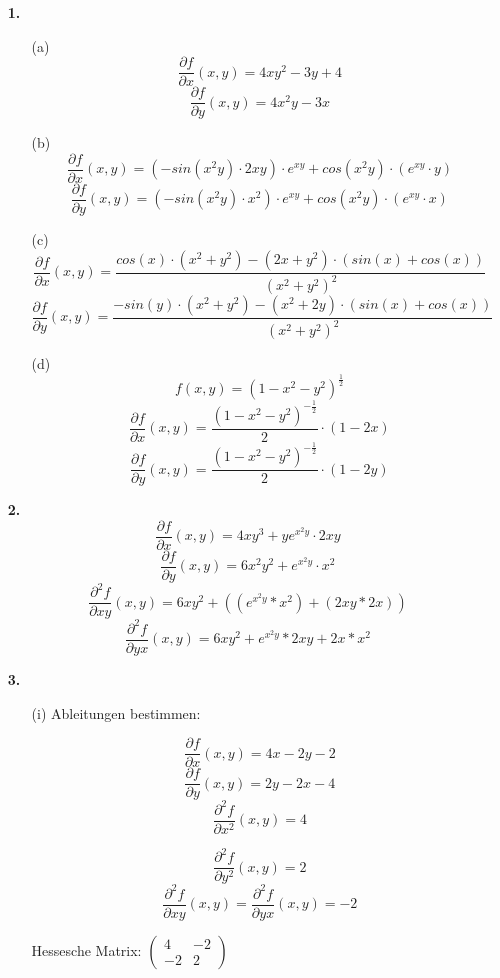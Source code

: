 \documentclass[a4paper,11pt,fleqn]{scrartcl}
\author{\authorinfo}
\title{\titleinfo}
\date{\today}
\newcommand{\partx}[0]{\frac{\partial f}{\partial x}  (x,y)}
\newcommand{\party}[0]{\frac{\partial f}{\partial y}  (x,y)}
\newcommand{\partxp}[1]{\frac{\partial^#1 f}{\partial x^#1}  (x,y)}
\newcommand{\partyp}[1]{\frac{\partial^#1 f}{\partial y^#1}  (x,y)}
\newcommand{\partxy}[1]{\frac{\partial^#1 f}{\partial xy}  (x,y)}
\newcommand{\partyx}[1]{\frac{\partial^#1 f}{\partial yx}  (x,y)}
\begin{document}
\maketitle
\begin{enumerate}
    \item[\textbf{1.}]
        \begin{enumerate}
            \item[(a)]
                \[\partx = 4xy^2 - 3y + 4\]
                \[\party = 4x^2 y - 3x\]  
            \item[(b)]
                \[\partx = (-sin(x^2y) \cdot 2xy) \cdot e^{xy} + cos(x^2y) \cdot (e^{xy} \cdot y)\]
                \[\party = (-sin(x^2y) \cdot x^2) \cdot e^{xy} + cos(x^2y) \cdot (e^{xy} \cdot x)\]
            \item[(c)]
                \[\partx = \frac{cos(x) \cdot (x^2 + y^2) - (2x + y^2) \cdot (sin(x) + cos(x))}{(x^2 + y^2)^2}\]
                \[\party = \frac{-sin(y) \cdot (x^2 + y^2) - (x^2 + 2y) \cdot (sin(x) + cos(x))}{(x^2 + y^2)^2}\]
            \item[(d)]
                \[f(x,y) = (1 - x^2 - y^2)^{\frac{1}{2}}\]
                \[\partx = \frac{(1 - x^2 -y^2)^{-\frac{1}{2}}}{2} \cdot (1 - 2x)\]
                \[\party = \frac{(1 - x^2 -y^2)^{-\frac{1}{2}}}{2} \cdot (1 - 2y)\] 
        \end{enumerate}
    \item[\textbf{2.}]
        \[\partx = 4xy^3 + ye^{x^2 y} \cdot 2xy\]
        \[\party = 6x^2y^2 + e^{x^2 y} \cdot x^2\]
        \[\partxy{2} = 6xy^2 + ((e^{x^2 y} * x^2) + (2xy * 2x)) \]
        \[\partyx{2} = 6xy^2 + e^{x^2 y} * 2xy + 2x * x^2\]

    \item[\textbf{3.}]
        \begin{enumerate}
            \item[(i)]
            Ableitungen bestimmen:
                \begin{multicols}{2}
                \[\partx = 4x -2y -2\]
                \[\party = 2y -2x -4\]
                \[\partxp{2} = 4\]


                \[\partyp{2} = 2\]
                \[\partxy{2} = \partyx{2} = -2\]
                \end{multicols}
                Hessesche Matrix: $                
                \begin{pmatrix}
                     4 & -2 \\
                    -2 &  2
                \end{pmatrix}
                $


\end{enumerate}
\end{enumerate}
\end{document}
